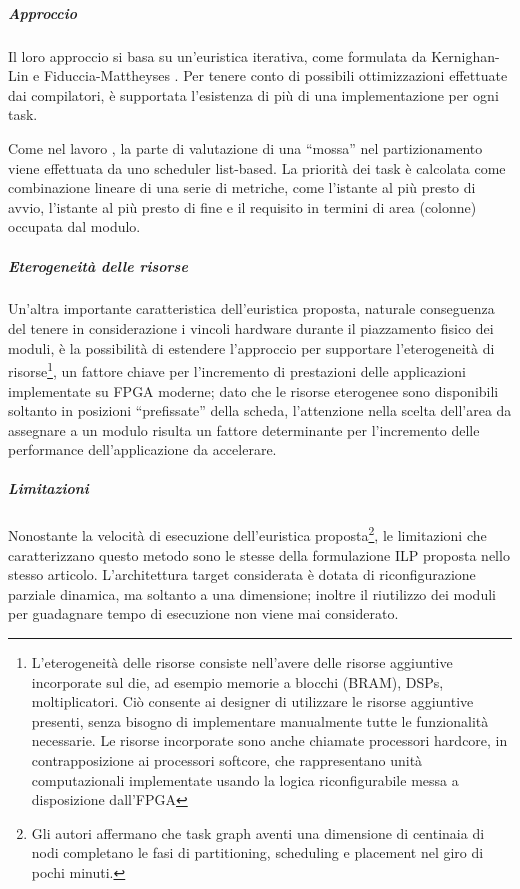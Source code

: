 
\subparagraph{Approccio}
Il loro approccio si basa su un'euristica iterativa, come formulata da 
Kernighan-Lin \cite{KernighanLin} e Fiduccia-Mattheyses 
\cite{FiducciaMattheyses}. Per tenere conto di possibili ottimizzazioni 
effettuate dai compilatori, è supportata l'esistenza di più di una 
implementazione per ogni task.

Come nel lavoro \cite{JeongHWSWCosynthesis}, la parte di valutazione di una 
``mossa'' nel partizionamento viene effettuata da uno scheduler list-based. La 
priorità dei task è calcolata come combinazione lineare di una serie di 
metriche, come l'istante al più presto di avvio, l'istante al più presto di 
fine e il requisito in termini di area (colonne) occupata dal modulo.


\subparagraph{Eterogeneità delle risorse}
Un'altra importante caratteristica dell'euristica proposta, naturale 
conseguenza del tenere in considerazione i vincoli hardware durante il 
piazzamento fisico dei moduli, è la possibilità di estendere l'approccio per 
supportare l'eterogeneità di risorse\footnote{L'eterogeneità delle risorse 
consiste nell'avere delle risorse aggiuntive incorporate sul die, ad esempio 
memorie a blocchi (\acs{BRAM}), \acp{DSP}, moltiplicatori. Ciò consente ai 
designer di utilizzare le risorse aggiuntive presenti, senza bisogno di 
implementare manualmente tutte le funzionalità necessarie. Le risorse 
incorporate sono anche chiamate processori hardcore, in contrapposizione ai 
processori softcore, che rappresentano unità computazionali implementate usando 
la logica riconfigurabile messa a disposizione dall'\ac{FPGA}}, un fattore 
chiave per l'incremento di prestazioni delle applicazioni implementate su 
\ac{FPGA} moderne; dato che le risorse eterogenee sono disponibili soltanto in 
posizioni ``prefissate'' della scheda, l'attenzione nella scelta dell'area da 
assegnare a un modulo risulta un fattore determinante per l'incremento delle 
performance dell'applicazione da accelerare.

\subparagraph{Limitazioni}
Nonostante la velocità di esecuzione dell'euristica proposta\footnote{Gli 
autori affermano che task graph aventi una dimensione di centinaia di nodi 
completano le fasi di partitioning, scheduling e placement nel giro di pochi 
minuti.}, le limitazioni che caratterizzano questo metodo sono le stesse della 
formulazione \ac{ILP} proposta nello stesso articolo. L'architettura target
considerata è dotata di riconfigurazione parziale dinamica, ma soltanto a una 
dimensione; inoltre il riutilizzo dei moduli per guadagnare tempo di esecuzione 
non viene mai considerato.

